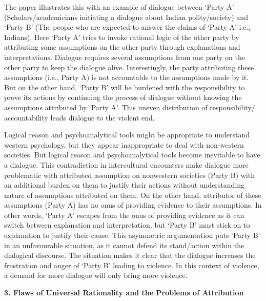 \begin{multicols}{2}
\noi
The paper illustrates this with an example of dialogue between ‘Party A’ (Scholars/academicians
initiating a dialogue about Indian polity/society) and ‘Party B’ (The people who are expected to
answer the claims of ‘Party A’ i.e., Indians). Here ‘Party A’ tries to invoke rational logic of the
other party by attributing some assumptions on the other party through explanations and
interpretations. Dialogue requires several assumptions from one party on the other party to keep
the dialogue alive. Interestingly, the party attributing these assumptions (i.e., Party A) is not
accountable to the assumptions made by it. But on the other hand, ‘Party B’ will be burdened with
the responsibility to prove its actions by continuing the process of dialogue without knowing the
assumptions attributed by ‘Party A’. This uneven distribution of responsibility/ accountability
leads dialogue to the violent end.

\noi
Logical reason and psychoanalytical tools might be appropriate to understand western
psychology, but they appear inappropriate to deal with non-western societies. But logical reason
and psychoanalytical tools become inevitable to have a dialogue. This contradiction in
intercultural encounters make dialogue more problematic with attributed assumption on nonwestern societies (Party B) with an additional burden on them to justify their actions without
understanding nature of assumptions attributed on them. On the other hand, attributor of these
assumptions (Party A) has no onus of providing evidence to their assumptions. In other words,
‘Party A’ escapes from the onus of providing evidence as it can switch between explanation and
interpretation, but ‘Party B’ must stick on to explanation to justify their cause. This asymmetric
argumentation puts ‘Party B’ in an unfavourable situation, as it cannot defend its stand/action
within the dialogical discourse. The situation makes it clear that the dialogue increases the
frustration and anger of ‘Party B’ leading to violence. In this context of violence, a demand for
more dialogue will only bring more violence.

\noi
{\large \bfseries 3. Flaws of Universal Rationality and the Problems of Attribution}


\end{multicols}
